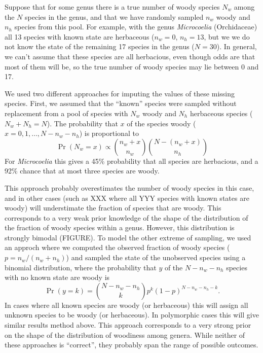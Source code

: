 \documentclass[12pt]{article}
\begin{document}
Suppose that for some genus there is a true number of woody species
$N_w$ among the $N$ species in the genus, and that we have randomly
sampled $n_w$ woody and $n_h$ species from this pool.
%
For example, with the genus \textit{Microcoelia} (Orchidaceae) all 13
species with known state are herbaceous ($n_w = 0$, $n_h = 13$, but we
we do not know the state of the remaining 17 species in the genus ($N
= 30$).  In general, we can't assume that these species are all
herbacious, even though odds are that most of them will be, so the
true number of woody species may lie between 0 and 17.

We used two different approaches for imputing the values of these
missing species.  First, we assumed that the ``known'' species were
sampled without replacement from a pool of species with $N_w$ woody
and $N_h$ herbaceous species ($N_w + N_h = N$).  The probability that
$x$ of the species woody ($x = 0, 1, \ldots, N
- n_w - n_h$) is proportional to
\begin{equation}
  \Pr(N_w = x) \propto {n_w + x \choose n_w}
  {N - (n_w + x) \choose n_h}
\end{equation}
For \textit{Microcoelia} this gives a 45\% probability that all
species are herbacious, and a 92\% chance that at most three species
are woody.

This approach probably overestimates the number of woody species in
this case, and in other cases (such as XXX where all YYY species with
known states are woody) will understimate the fraction of species that
are woody.  This corresponds to a very weak prior knowledge of the
shape of the distribution of the fraction of woody species within a
genus.  However, this distribution is strongly bimodal (FIGURE).  To
model the other extreme of sampling, we used an approch where we
computed the observed fraction of woody species ($p = n_w / (n_w +
n_h)$) and sampled the state of the unobserved species using a
binomial distribution, where the probability that $y$ of the $N - n_w
- n_h$ species with no known state are woody is
\begin{equation}
  \Pr(y = k) = {N - n_w - n_h \choose k} p^k (1-p)^{N - n_w - n_h - k}.
\end{equation}
In cases where all known species are woody (or herbaceous) this will
assign all unknown species to be woody (or herbaceous).  In
polymorphic cases this will give similar results method above.  This
approach corresponds to a very strong prior on the shape of the
distribution of woodiness among genera.
While neither of these approaches is ``correct'', they probably
span the range of possible outcomes.
\end{document}
